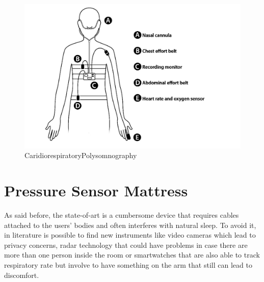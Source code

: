 \begin{figure}[H]
    \centering
    \includegraphics[width=\textwidth]{img/CardioPSG.jpg}
    \caption{CaridiorespiratoryPolysomnography}
    \label{fig:PSGCardio}
\end{figure}

\section{Pressure Sensor Mattress}

As said before, the state-of-art is a cumbersome device that requires cables attached to the users' bodies and often interferes with natural sleep. To avoid it, in literature is possible to find new instruments like video cameras which lead to privacy concerns, radar technology that could have problems in case there are more than one person inside the room or smartwatches that are also able to track respiratory rate but involve to have something on the arm that still can lead to discomfort.

